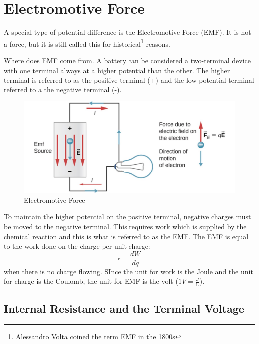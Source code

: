 \documentclass[14pt]{memoir}
\begin{document}
\section{Electromotive Force}

A special type of potential difference is the Electromotive Force (EMF). It is not a force, but it is still called this for historical\footnote{Alessandro Volta coined the term EMF in the 1800s} reasons. 

Where does EMF come from. A battery can be considered a two-terminal device with one terminal always at a higher potential than the other. The higher terminal is referred to as the positive terminal (+) and the low potential terminal referred to a the negative terminal (-). 

\begin{figure}[H]
\begin{center}
\includegraphics[scale=0.50]{fig/fig_10_03.jpg}
\caption{Electromotive Force}
\label{fig:10_03}
\end{center}
\end{figure}

To maintain the higher potential on the positive terminal, negative charges must be moved to the negative terminal. This requires work which is supplied by the chemical reaction and this is what is referred to as the EMF. The EMF is equal to the work done on the charge per unit charge:
\begin{equation}
\epsilon = \frac{dW}{dq}
\end{equation}
when there is no charge flowing. SInce the unit for work is the Joule and the unit for charge is the Coulomb, the unit for EMF is the volt ($1V = \frac{J}{C}$).

\subsection{Internal Resistance and the Terminal Voltage}
\end{document}
